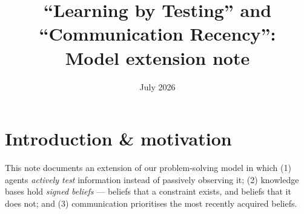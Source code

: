 \documentclass{article}
\title{``Learning by Testing'' and ``Communication Recency'':\\ Model extension note}
\author{}
\date{July 2026}
\begin{document}
\maketitle



\section{Introduction \& motivation}\label{sec:motivation}

This note documents an extension of our problem-solving model in which (1) agents \emph{actively test} information instead of passively observing it; (2) knowledge bases hold \emph{signed beliefs} --- beliefs that a constraint exists, and beliefs that it does not; and (3) communication prioritises the most recently acquired beliefs. 
\end{document}
